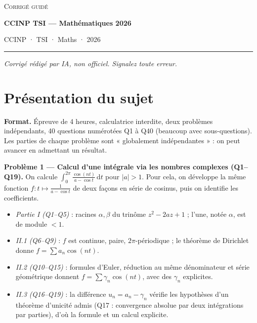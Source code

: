 \documentclass[11pt,a4paper]{article}
\providecommand{\tightlist}{\setlength{\itemsep}{0pt}\setlength{\parskip}{0pt}}
\begin{document}
\thispagestyle{plain}
\begin{center}
  {\small\scshape Corrigé guidé}\par\smallskip
  {\LARGE\bfseries CCINP TSI — Mathématiques 2026\par}\medskip
  {\large CCINP · TSI · Maths · 2026\par}
\end{center}
\vspace{2pt}\hrule\vspace{8pt}

\emph{Corrigé rédigé par IA, non officiel. Signalez toute erreur.}

\hypertarget{pruxe9sentation-du-sujet}{%
\section{Présentation du sujet}\label{pruxe9sentation-du-sujet}}

\textbf{Format.} Épreuve de 4 heures, calculatrice interdite, deux problèmes indépendants, 40 questions numérotées Q1 à Q40 (beaucoup avec sous-questions). Les parties de chaque problème sont « globalement indépendantes » : on peut avancer en admettant un résultat.

\textbf{Problème 1 --- Calcul d'une intégrale via les nombres complexes (Q1--Q19).} On calcule \(\displaystyle\int_0^{2\pi}\frac{\cos(nt)}{a-\cos t}\,\mathrm dt\) pour \(|a|>1\). Pour cela, on développe la même fonction \(f:t\mapsto\frac1{a-\cos t}\) de deux façons en série de cosinus, puis on identifie les coefficients.

\begin{itemize}
\tightlist
\item
  \emph{Partie I (Q1--Q5)} : racines \(\alpha,\beta\) du trinôme \(z^2-2az+1\) ; l'une, notée \(\alpha\), est de module \(<1\).
\item
  \emph{II.1 (Q6--Q9)} : \(f\) est continue, paire, \(2\pi\)-périodique ; le théorème de Dirichlet donne \(f=\sum a_n\cos(nt)\).
\item
  \emph{II.2 (Q10--Q15)} : formules d'Euler, réduction au même dénominateur et série géométrique donnent \(f=\sum\gamma_n\cos(nt)\), avec des \(\gamma_n\) explicites.
\item
  \emph{II.3 (Q16--Q19)} : la différence \(u_n=a_n-\gamma_n\) vérifie les hypothèses d'un théorème d'unicité admis (Q17 : convergence absolue par deux intégrations par parties), d'où la formule et un calcul explicite.
\end{itemize}
\end{document}

